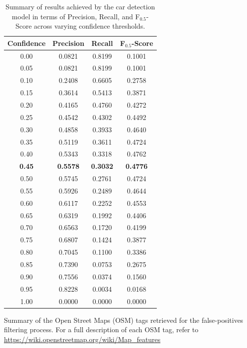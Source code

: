 \documentclass[sn-basic]{sn-jnl}%
\begin{document}
{\begin{appendices}
\begin{table}
\centering
\caption{Summary of results achieved by the car detection model in terms of Precision, Recall, and F$_{0.5}$-Score across varying confidence thresholds.}
\label{SM_Conf_Thr_Table}
\begin{tabular}{cccc}
\toprule
\textbf{Confidence} & \textbf{Precision} & \textbf{Recall} & \textbf{F$_{0.5}$-Score} \\
\midrule
0.00 & 0.0821 & 0.8199 & 0.1001 \\
0.05 & 0.0821 & 0.8199 & 0.1001 \\
0.10 & 0.2408 & 0.6605 & 0.2758 \\
0.15 & 0.3614 & 0.5413 & 0.3871 \\
0.20 & 0.4165 & 0.4760 & 0.4272 \\
0.25 & 0.4542 & 0.4302 & 0.4492 \\
0.30 & 0.4858 & 0.3933 & 0.4640 \\
0.35 & 0.5119 & 0.3611 & 0.4724 \\
0.40 & 0.5343 & 0.3318 & 0.4762 \\
\textbf{0.45} & \textbf{0.5578} & \textbf{0.3032} & \textbf{0.4776} \\
0.50 & 0.5745 & 0.2761 & 0.4724 \\
0.55 & 0.5926 & 0.2489 & 0.4644 \\
0.60 & 0.6117 & 0.2252 & 0.4553 \\
0.65 & 0.6319 & 0.1992 & 0.4406 \\
0.70 & 0.6563 & 0.1720 & 0.4199 \\
0.75 & 0.6807 & 0.1424 & 0.3877 \\
0.80 & 0.7045 & 0.1100 & 0.3386 \\
0.85 & 0.7390 & 0.0753 & 0.2675 \\
0.90 & 0.7556 & 0.0374 & 0.1560 \\
0.95 & 0.8228 & 0.0034 & 0.0168 \\
1.00 & 0.0000 & 0.0000 & 0.0000 \\
\bottomrule
\end{tabular}
\end{table}



\begin{table}

    \caption{Summary of the Open Street Maps (OSM) tags retrieved for the  false-positives filtering process. For a full description of each OSM tag, refer to \url{https://wiki.openstreetmap.org/wiki/Map_features}}
    \label{SM_OSM_Table}
    

\end{table}
\end{appendices}}
\end{document}

